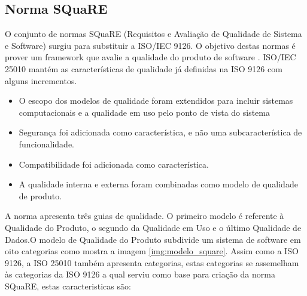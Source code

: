 \subsection{Norma SQuaRE}
O conjunto de normas SQuaRE (Requisitos e Avaliação de Qualidade de Sistema e Software) surgiu para substituir a ISO/IEC 9126. O objetivo destas normas é prover um framework que avalie a qualidade do produto de software \cite{luiza_yago}. ISO/IEC 25010 mantém as características de qualidade já definidas na ISO 9126 com alguns incrementos.

\begin{itemize}
\item O escopo dos modelos de qualidade foram extendidos para incluir sistemas computacionais e a qualidade em uso pelo ponto de vista do sistema
\item Segurança foi adicionada como característica, e não uma subcaracterística de funcionalidade.
\item Compatibilidade foi adicionada como característica.
\item A qualidade interna e externa foram combinadas como modelo de qualidade de produto.
\end{itemize}

A norma apresenta três guias de qualidade. O primeiro modelo é referente à Qualidade do Produto, o segundo da Qualidade em Uso e o último Qualidade de Dados.O modelo de Qualidade do Produto subdivide um sistema de software em oito categorias como mostra a imagem \ref{img:modelo_square}.
Assim como a ISO 9126, a ISO 25010 também apresenta categorias, estas categorias se assemelham às categorias da ISO 9126 a qual serviu como base para criação da norma SQuaRE, estas caracteristicas são:

